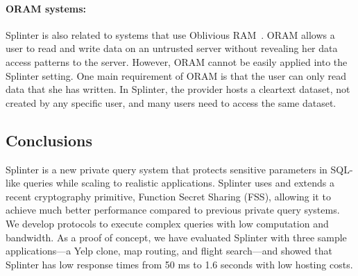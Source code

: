 \paragraph{ORAM systems:}
Splinter is also related to systems that use Oblivious RAM~\cite{stefanov:path-oram, lorch2013shroud}. 
ORAM allows a user to read and write data on an untrusted server without
revealing her data access patterns to the server. However, ORAM cannot be easily applied
into the Splinter setting. One main requirement of ORAM is that the user
can only read data that she has written. 
In Splinter, the provider hosts a cleartext dataset, not created by any specific user, 
and many users need to access the same dataset.

\subsection{Conclusions}
\label{spl-sec:conclusion}
Splinter is a new private query system that protects sensitive parameters
in SQL-like queries while scaling to realistic applications. Splinter uses and extends a recent
cryptography primitive, Function Secret Sharing (FSS),
allowing it to achieve much better
performance compared to previous private query systems. We develop
protocols to execute complex queries
with low computation and bandwidth. As a proof of concept,
we have evaluated Splinter with three sample applications---a Yelp clone,
map routing, and flight search---and showed
that Splinter has low response times from 50 ms to 1.6 seconds with low
hosting costs.
